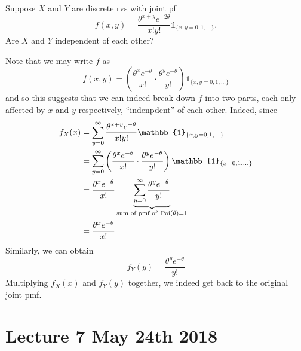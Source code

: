 \documentclass[notoc,notitlepage]{tufte-book}
\begin{document}
\begin{eg}[Example 3.6]
  Suppose $X$ and $Y$ are discrete rvs with joint pf
  \begin{equation*}
    f(x, y) = \frac{\theta^{x + y} e^{- 2 \theta}}{x! y!} \mathbb{1}_{\{x, y = 0, 1, ...\}}.
  \end{equation*}
  Are $X$ and $Y$ independent of each other?

  \begin{solution} 
    Note that we may write $f$ as
    \begin{equation*}
      f(x, y) = \left( \frac{\theta^x e^{-\theta}}{x!} \cdot \frac{\theta^y e^{- \theta}}{y!} \right) \mathbb{1}_{\{x, y = 0, 1, ...\}}
    \end{equation*}
    and so this suggests that we can indeed break down $f$ into two parts, each only affected by $x$ and $y$ respectively, ``indenpdent'' of each other. Indeed, since
    \begin{align*}
      f_X(x) &= \sum_{y = 0}^{\infty} \frac{\theta^{x + y} e^{- \theta}}{x! y!} \mathbb{1}_{\{x,y = 0, 1, ... \}} \\
        &= \sum_{y = 0}^{\infty} \left( \frac{\theta^x e^{-\theta}}{x!} \cdot \frac{\theta^y e^{- \theta}}{y!} \right) \mathbb{1}_{\{x = 0, 1, ...\}} \\
        &= \frac{\theta^x e^{-\theta}}{x!} \underbrace{ \sum_{y = 0}^{\infty} \frac{\theta^y e^{-\theta}}{y!} }_{\text{sum of pmf of } \Poi(\theta) = 1} \\
        &= \frac{\theta^x e^{-\theta}}{x!}
    \end{align*}
    Similarly, we can obtain
    \begin{equation*}
      f_Y(y) = \frac{\theta^y e^{-\theta}}{y!}
    \end{equation*}
    Multiplying $f_X(x)$ and $f_Y(y)$ together, we indeed get back to the original joint pmf.
  \end{solution}
\end{eg}




\chapter{Lecture 7 May 24th 2018}%
\label{chp:lecture_7_may_24th_2018}
\end{document}
